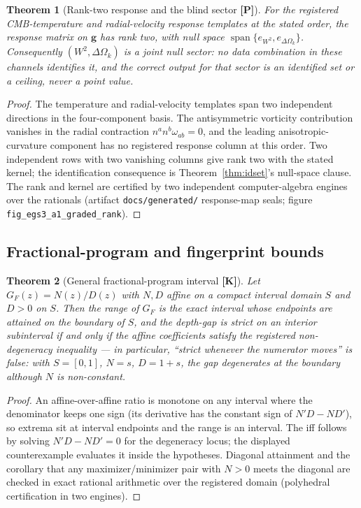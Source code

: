 \documentclass[10pt]{article}
\newtheorem{theorem}{Theorem}[section]
\theoremstyle{definition}
\newcommand{\code}[1]{\texttt{\small #1}}
\newcommand{\tier}[1]{\textbf{[#1]}}
\newcommand{\dOk}{\Delta\Omega_{k}}
\begin{document}
\begin{theorem}[Rank-two response and the blind sector \tier{P}]
\label{thm:rank2}
For the registered CMB-temperature and radial-velocity response
templates at the stated order, the response matrix on
$\bm g$ has rank two, with null space
$\operatorname{span}\{e_{W^2}, e_{\dOk}\}$. Consequently $(W^2, \dOk)$
is a joint null sector: no data combination in these channels
identifies it, and the correct output for that sector is an identified
set or a ceiling, never a point value.
\end{theorem}
\begin{proof}
The temperature and radial-velocity templates span two independent
directions in the four-component basis. The antisymmetric vorticity
contribution vanishes in the radial contraction $n^a n^b \omega_{ab} =
0$, and the leading anisotropic-curvature component has no registered
response column at this order. Two independent rows with two vanishing
columns give rank two with the stated kernel; the identification
consequence is Theorem~\ref{thm:idset}'s null-space clause. The rank
and kernel are certified by two independent computer-algebra engines
over the rationals (artifact
\code{docs/generated/} response-map seals; figure
\code{fig\_egs3\_a1\_graded\_rank}).
\end{proof}

\subsection{Fractional-program and fingerprint bounds}

\begin{theorem}[General fractional-program interval \tier{K}]
\label{thm:t2g}
Let $G_F(z) = N(z)/D(z)$ with $N, D$ affine on a compact interval
domain $S$ and $D > 0$ on $S$. Then the range of $G_F$ is the exact
interval whose endpoints are attained on the boundary of $S$, and the
depth-gap is \emph{strict} on an interior subinterval if and only if
the affine coefficients satisfy the registered non-degeneracy
inequality --- in particular, ``strict whenever the numerator moves''
is false: with $S = [0,1]$, $N = s$, $D = 1+s$, the gap degenerates at
the boundary although $N$ is non-constant.
\end{theorem}
\begin{proof}
An affine-over-affine ratio is monotone on any interval where the
denominator keeps one sign (its derivative has the constant sign of
$N'D - ND'$), so extrema sit at interval endpoints and the range is an
interval. The iff follows by solving $N'D - ND' = 0$ for the
degeneracy locus; the displayed counterexample evaluates it inside the
hypotheses. Diagonal attainment and the corollary that any
maximizer/minimizer pair with $N > 0$ meets the diagonal are checked
in exact rational arithmetic over the registered domain
(polyhedral certification in two engines).
\end{proof}
\end{document}
